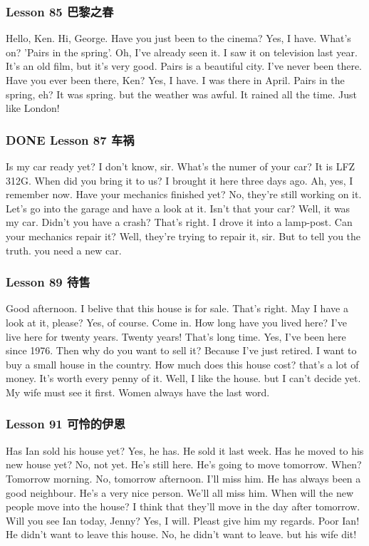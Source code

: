 \documentclass[11pt]{ctexart}
\begin{document}
\subsubsection{Lesson 85 巴黎之春}
\label{sec:org5db485d}
Hello, Ken.
Hi, George.
Have you just been to the cinema?
Yes, I have.
What's on?
'Pairs in the spring'.
Oh, I've already seen it.
I saw it on television last year.
It's an old film, but it's very good.
Pairs is a beautiful city.
I've never been  there.
Have you ever been there, Ken?
Yes, I have. I was there in April.
Pairs in the spring, eh?
It was spring.
but the weather was awful.
It rained all the time.
Just like London!

\subsubsection{{\bfseries\sffamily DONE} Lesson 87 车祸}
\label{sec:org3f5ae0b}
Is my car ready yet?
I don't know, sir.
What's the numer of your car?
It is LFZ 312G.
When did you bring it to us?
I brought it here three days ago.
Ah, yes, I remember now.
Have your mechanics finished yet?
No, they're still working on it.
Let's go into the garage and have a look at it.
Isn't that your car?
Well, it was my car.
Didn't you have a crash?
That's right.
I drove it into a lamp-post.
Can your mechanics repair it?
Well, they're trying to repair it, sir.
But to tell you the truth.
you need a new car.
\subsubsection{Lesson 89 待售}
\label{sec:orgfa0a989}
Good afternoon.
I belive that this house is for sale. That's right.
May I have a look at it, please?
Yes, of course. Come in.
How long have you lived here?
I've live here for twenty years.
Twenty years!
That's long time.
Yes, I've been here since 1976.
Then why do you want to sell it?
Because I've just retired.
I want to buy a small house in the country.
How much does this house cost?
that's a lot of money.
It's worth every penny of it.
Well, I like the house.
but I can't decide yet.
My wife must see it first.
Women always have the last word.
\subsubsection{Lesson 91 可怜的伊恩}
\label{sec:org8b73465}
Has Ian sold his house yet?
Yes, he has.
He sold it last week.
Has he moved to his new house yet?
No, not yet.
He's still here.
He's going to move tomorrow.
When? Tomorrow morning.
No, tomorrow afternoon.
I'll miss him.
He has always been a good neighbour.
He's a very nice person.
We'll all miss him.
When will the new people move into the house?
I think that they'll move in the day after tomorrow.
Will you see Ian today, Jenny?
Yes, I will.
Pleast give him my regards.
Poor Ian!
He didn't want to leave this house.
No, he didn't want to leave.
but his wife dit!
\end{document}
